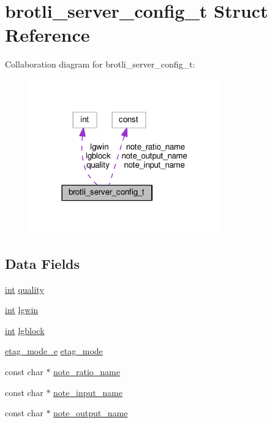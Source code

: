 \hypertarget{structbrotli__server__config__t}{}\section{brotli\+\_\+server\+\_\+config\+\_\+t Struct Reference}
\label{structbrotli__server__config__t}


Collaboration diagram for brotli\+\_\+server\+\_\+config\+\_\+t\+:
\nopagebreak
\begin{figure}[H]
\begin{center}
\leavevmode
\includegraphics[width=234pt]{structbrotli__server__config__t__coll__graph}
\end{center}
\end{figure}
\subsection*{Data Fields}
\begin{DoxyCompactItemize}
\item 
\hyperlink{pcre_8txt_a42dfa4ff673c82d8efe7144098fbc198}{int} \hyperlink{structbrotli__server__config__t_ad2625c3e4ab5eb771ae76fa428a9d772}{quality}
\item 
\hyperlink{pcre_8txt_a42dfa4ff673c82d8efe7144098fbc198}{int} \hyperlink{structbrotli__server__config__t_a2f6b30b785d2b29d4a61ec74adb89357}{lgwin}
\item 
\hyperlink{pcre_8txt_a42dfa4ff673c82d8efe7144098fbc198}{int} \hyperlink{structbrotli__server__config__t_a5c3811fbb355f1057e68a032cbd7f5ec}{lgblock}
\item 
\hyperlink{mod__brotli_8c_ad92bcd088f32022df9ccdc017760e59f}{etag\+\_\+mode\+\_\+e} \hyperlink{structbrotli__server__config__t_a0a1f4d492fbc7a1fe0bfe876fc3bc802}{etag\+\_\+mode}
\item 
const char $\ast$ \hyperlink{structbrotli__server__config__t_aba2454e3dc686c50c3dbd53ba3a1a9b8}{note\+\_\+ratio\+\_\+name}
\item 
const char $\ast$ \hyperlink{structbrotli__server__config__t_a8f5f8d9fd8895ec24e0e1d4d12604c68}{note\+\_\+input\+\_\+name}
\item 
const char $\ast$ \hyperlink{structbrotli__server__config__t_adbc5a20eb7a9ad4bfb1839f54af580c2}{note\+\_\+output\+\_\+name}
\end{DoxyCompactItemize}


